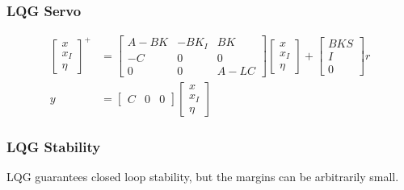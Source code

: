 \subsubsection{LQG Servo}
\begin{align*}
    \begin{bmatrix}
        x \\
        x_I \\
        \eta
    \end{bmatrix}^+\!
    &=\! \begin{bmatrix}
        A - BK & -BK_I & BK \\
        -C & 0 & 0 \\
        0 & 0 & A - LC
    \end{bmatrix}\!
    \begin{bmatrix}
        x \\
        x_I \\
        \eta
    \end{bmatrix}\! + \!
    \begin{bmatrix}
        BKS \\
        I \\
        0
    \end{bmatrix}\! r\\
    y &= \begin{bmatrix} C & 0 & 0 \end{bmatrix}
    \begin{bmatrix}
        x \\
        x_I \\
        \eta
    \end{bmatrix}
\end{align*}

\subsubsection{LQG Stability}
LQG guarantees closed loop stability, but the margins can be arbitrarily small.